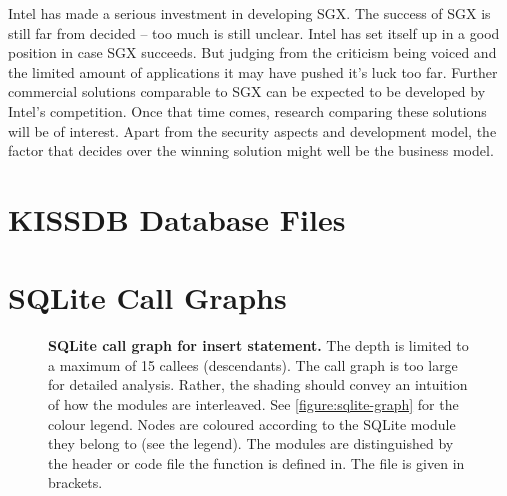 Intel has made a serious investment in developing SGX.\label{ID_54424196}
The success of SGX is still far from decided -- too much is still unclear.\label{ID_759430231}
Intel has set itself up in a good position in case SGX succeeds. But judging from the criticism being voiced and the limited amount of applications it may have pushed it's luck too far.\label{ID_971205965}
Further commercial solutions comparable to SGX can be expected to be developed by Intel's competition.\label{ID_1853880623}
Once that time comes, research comparing these solutions will be of interest.\label{ID_1918961193}
Apart from the security aspects and development model, the factor that decides over the winning solution might well be the business model.\label{ID_806891106}
\appendix\label{ID_1376207046}

\chapter{KISSDB Database Files\label{ID_1278383992}\label{appendix:kissdb-files}}
\label{ID_1976669807}
\label{ID_126877500}

\chapter{SQLite Call Graphs\label{ID_686469438}\label{appendix:sqlite}}
\begin{sidewaysfigure}
\caption{\textbf{SQLite call graph for insert statement.} The depth is limited to a maximum of 15 callees (descendants). The call graph is too large for detailed analysis. Rather, the shading should convey an intuition of how the modules are interleaved. See \autoref{figure:sqlite-graph} for the colour legend. Nodes are coloured according to the SQLite module they belong to (see the legend). The modules are distinguished by the header or code file the function is defined in. The file is given in brackets.\label{ID_196264389}\label{ID_196264389}}
\end{sidewaysfigure}



